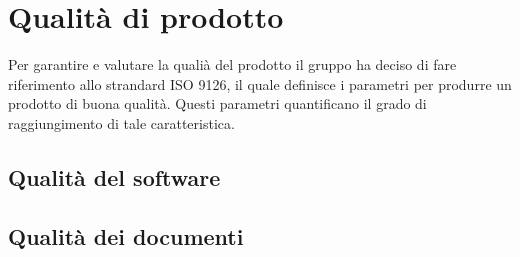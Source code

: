 \section{Qualità di prodotto}
	Per garantire e valutare la qualià del prodotto il gruppo ha deciso di fare riferimento allo strandard ISO 9126, il quale definisce i parametri per produrre un prodotto di buona qualità. Questi parametri quantificano il grado di raggiungimento di tale caratteristica.
	\subsection{Qualità del software}
	\subsection{Qualità dei documenti}
